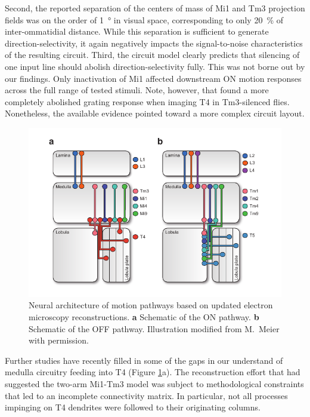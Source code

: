 Second, the reported separation of the centers of mass of Mi1 and Tm3 projection fields was on the order of \SI{1}{\degree} in visual space, corresponding to only \SI{20}{\percent} of inter-ommatidial distance. While this separation is sufficient to generate direction-selectivity, it again negatively impacts the signal-to-noise characteristics of the resulting circuit. Third, the circuit model clearly predicts that silencing of one input line should abolish direction-selectivity fully. This was not borne out by our findings. Only inactivation of Mi1 affected downstream ON motion responses across the full range of tested stimuli. Note, however, that \citet{Strother:2017aa} found a more completely abolished grating response when imaging T4 in Tm3-silenced flies. Nonetheless, the available evidence pointed toward a more complex circuit layout.

\begin{figure}
    \centering
    \includegraphics[width=1\textwidth]{graphics/figure_pathway}
    \caption[Map of ON and OFF pathways]
    {Neural architecture of motion pathways based on updated electron microscopy reconstructions. \textbf{a} Schematic of the ON pathway. \textbf{b} Schematic of the OFF pathway. Illustration modified from M.\ Meier with permission.}
    \label{fig:pathway}
\end{figure}

Further studies have recently filled in some of the gaps in our understand of medulla circuitry feeding into T4 (Figure \ref{fig:pathway}a). The reconstruction effort that had suggested the two-arm Mi1-Tm3 model was subject to methodological constraints that led to an incomplete connectivity matrix. In particular, not all processes impinging on T4 dendrites were followed to their originating columns.

